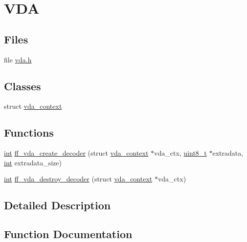 \hypertarget{group__lavc__codec__hwaccel__vda}{}\section{V\+DA}
\label{group__lavc__codec__hwaccel__vda}
\subsection*{Files}
\begin{DoxyCompactItemize}
\item 
file \hyperlink{vda_8h}{vda.\+h}
\end{DoxyCompactItemize}
\subsection*{Classes}
\begin{DoxyCompactItemize}
\item 
struct \hyperlink{structvda__context}{vda\+\_\+context}
\end{DoxyCompactItemize}
\subsection*{Functions}
\begin{DoxyCompactItemize}
\item 
\hyperlink{xmltok_8h_a5a0d4a5641ce434f1d23533f2b2e6653}{int} \hyperlink{group__lavc__codec__hwaccel__vda_gac1efc3b9787748648228c97845fc4c52}{ff\+\_\+vda\+\_\+create\+\_\+decoder} (struct \hyperlink{structvda__context}{vda\+\_\+context} $\ast$vda\+\_\+ctx, \hyperlink{lib-src_2ffmpeg_2win32_2stdint_8h_a9a941819355e6f658991890ff66b4b0e}{uint8\+\_\+t} $\ast$extradata, \hyperlink{xmltok_8h_a5a0d4a5641ce434f1d23533f2b2e6653}{int} extradata\+\_\+size)
\item 
\hyperlink{xmltok_8h_a5a0d4a5641ce434f1d23533f2b2e6653}{int} \hyperlink{group__lavc__codec__hwaccel__vda_ga032d202aa5c1eea108b6305670bc3322}{ff\+\_\+vda\+\_\+destroy\+\_\+decoder} (struct \hyperlink{structvda__context}{vda\+\_\+context} $\ast$vda\+\_\+ctx)
\end{DoxyCompactItemize}


\subsection{Detailed Description}


\subsection{Function Documentation}
